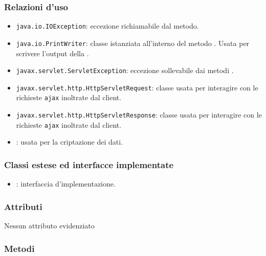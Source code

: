 \subsubsection*{Relazioni d'uso}
\begin{itemize}
	\item \texttt{java.io.IOException}: eccezione richiamabile dal metodo.
	\item \texttt{java.io.PrintWriter}: classe istanziata all'interno del metodo . Usata per scrivere l'output della .
	\item \texttt{javax.servlet.ServletException}: eccezione sollevabile dai metodi .
	\item \texttt{javax.servlet.http.HttpServletRequest}: classe usata per interagire con le richieste \texttt{ajax} inoltrate dal client.
	\item \texttt{javax.servlet.http.HttpServletResponse}: classe usata per interagire con le richieste \texttt{ajax} inoltrate dal client.
	\item {}: usata per la criptazione dei dati.
\end{itemize}

\subsubsection*{Classi estese ed interfacce implementate}

\begin{itemize}
	\item {}: interfaccia d'implementazione.
\end{itemize}

\subsubsection*{Attributi}

Nessun attributo evidenziato

\subsubsection*{Metodi}

